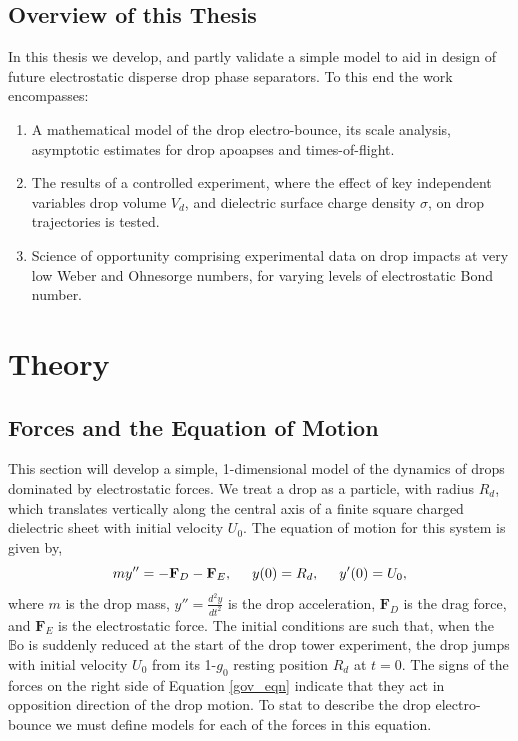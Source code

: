 \documentclass[12pt,a4paper,oneside]{book}
\begin{document}
\section{Overview of this Thesis}
In this thesis we develop, and partly validate a simple model to aid in design of future electrostatic disperse drop phase separators. To this end the work encompasses:
\begin{enumerate}
\item A mathematical model of the drop electro-bounce, its scale analysis, asymptotic estimates for drop apoapses and times-of-flight.
\item The results of a controlled experiment, where the effect of key independent variables drop volume $V_d$, and dielectric surface charge density $\sigma$, on drop trajectories is tested.
\item Science of opportunity comprising experimental data on drop impacts at very low Weber and Ohnesorge numbers, for varying levels of electrostatic Bond number. 
\end{enumerate}

\chapter{Theory}
\section{Forces and the Equation of Motion}
This section will develop a simple, 1-dimensional model of the dynamics of drops dominated by electrostatic forces. We treat a drop as a particle, with radius $R_d$, which translates vertically along the central axis of a finite square charged dielectric sheet with initial velocity $U_0$. The equation of motion for this system is given by,
\begin{equation}
m y'' = - \mathbf{F}_D - \mathbf{F}_E, \hspace{5 mm} y(0) = R_d, \hspace{5 mm} y'(0) = U_0,
\label{gov_eqn}
\end{equation}
where $m$ is the drop mass, $y'' = \frac{d^2 y}{d t^2}$ is the drop acceleration, $\mathbf{F}_D$ is the drag force, and $\mathbf{F}_E$ is the electrostatic force. The initial conditions are such that, when the $\mathbb{B}\mbox{o}$ is suddenly reduced at the start of the drop tower experiment, the drop jumps with initial velocity $U_0$ from its 1-$g_0$ resting position $R_d$ at $t=0$. The signs of the forces on the right side of Equation \ref{gov_eqn} indicate that they act in opposition direction of the drop motion. To stat to describe the drop electro-bounce we must define models for each of the forces in this equation.
\end{document}
